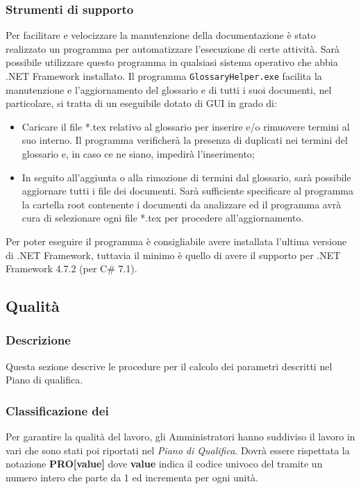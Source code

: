 \subsubsection{Strumenti di supporto}
Per facilitare e velocizzare la manutenzione della documentazione è stato realizzato un programma per automatizzare l’esecuzione di certe attività. Sarà possibile utilizzare questo programma in qualsiasi sistema operativo che abbia .NET Framework installato. Il programma \texttt{GlossaryHelper.exe} facilita la manutenzione e l’aggiornamento del glossario e di tutti i suoi documenti, nel particolare, si tratta di un eseguibile dotato di GUI in grado di:
\begin{itemize}
	\item Caricare il file *.tex relativo al glossario per inserire e/o rimuovere termini al suo interno. Il programma verificherà la presenza di duplicati nei termini del glossario e, in caso ce ne siano, impedirà l’inserimento;
	\item In seguito all’aggiunta o alla rimozione di termini dal glossario, sarà possibile aggiornare tutti i file dei documenti. Sarà sufficiente specificare al programma la cartella root contenente i documenti da analizzare ed il programma avrà cura di selezionare ogni file *.tex per procedere all’aggiornamento.
\end{itemize}
Per poter eseguire il programma è consigliabile avere installata l’ultima versione di .NET Framework, tuttavia il  minimo è quello di avere il supporto per .NET Framework 4.7.2 (per C\# 7.1).
\subsection{Qualità}
\subsubsection{Descrizione}
Questa sezione descrive le procedure per il calcolo dei parametri descritti nel Piano di qualifica.
\subsubsection{Classificazione dei }
Per garantire la qualità del lavoro, gli Amministratori hanno suddiviso il lavoro in vari  che sono stati poi riportati nel \emph{Piano di Qualifica}. Dovrà essere rispettata la notazione \textbf{PRO[value]}  dove \textbf{value} indica il codice univoco del  tramite un numero intero che parte da 1 ed incrementa per ogni unità.
